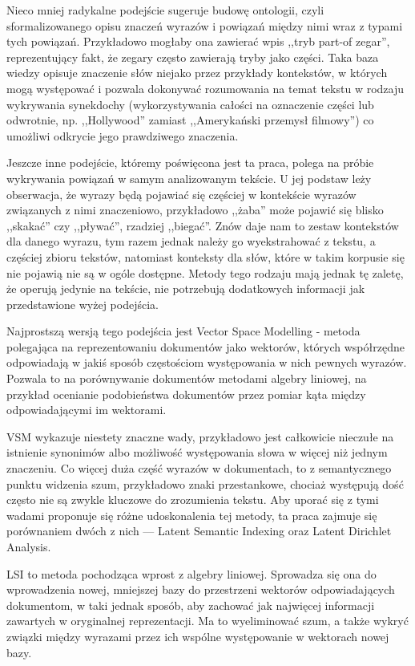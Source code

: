 \documentclass[11pt,a4paper]{article}
\begin{document}
Nieco mniej radykalne podejście sugeruje budowę ontologii, czyli
sformalizowanego opisu znaczeń wyrazów i powiązań między nimi wraz z typami
tych powiązań. Przykładowo mogłaby ona zawierać wpis ,,tryb part-of zegar'',
reprezentujący fakt, że zegary często zawierają tryby jako części. Taka baza
wiedzy opisuje znaczenie słów niejako przez przykłady kontekstów, w których
mogą występować i pozwala dokonywać rozumowania na temat tekstu w rodzaju
wykrywania synekdochy (wykorzystywania całości na oznaczenie części lub
odwrotnie, np. ,,Hollywood'' zamiast ,,Amerykański przemysł filmowy'') co
umożliwi odkrycie jego prawdziwego znaczenia.

Jeszcze inne podejście, któremy poświęcona jest ta praca, polega na próbie
wykrywania powiązań w samym analizowanym tekście. U jej podstaw leży
obserwacja, że wyrazy będą pojawiać się częściej w kontekście wyrazów
związanych z nimi znaczeniowo, przykładowo ,,żaba'' może pojawić się blisko
,,skakać'' czy ,,pływać'', rzadziej ,,biegać''. Znów daje nam to zestaw
kontekstów dla danego wyrazu, tym razem jednak należy go wyekstrahować z
tekstu, a częściej zbioru tekstów, natomiast konteksty dla słów, które w takim
korpusie się nie pojawią nie są w ogóle dostępne. Metody tego rodzaju mają
jednak tę zaletę, że operują jedynie na tekście, nie potrzebują dodatkowych
informacji jak przedstawione wyżej podejścia.

Najprostszą wersją tego podejścia jest Vector Space Modelling - metoda
polegająca na reprezentowaniu dokumentów jako wektorów, których współrzędne
odpowiadają w jakiś sposób częstościom występowania w nich pewnych wyrazów.
Pozwala to na porównywanie dokumentów metodami algebry liniowej, na przykład
ocenianie podobieństwa dokumentów przez pomiar kąta między odpowiadającymi im
wektorami.

VSM wykazuje niestety znaczne wady, przykładowo jest całkowicie nieczułe na
istnienie synonimów albo możliwość występowania słowa w więcej niż jednym
znaczeniu. Co więcej duża część wyrazów w dokumentach, to z semantycznego
punktu widzenia szum, przykładowo znaki przestankowe, chociaż występują dość
często nie są zwykle kluczowe do zrozumienia tekstu. Aby uporać się z tymi
wadami proponuje się różne udoskonalenia tej metody, ta praca zajmuje się
porównaniem dwóch z nich --- Latent Semantic Indexing oraz Latent Dirichlet
Analysis.

LSI to metoda pochodząca wprost z algebry liniowej. Sprowadza się ona do
wprowadzenia nowej, mniejszej bazy do przestrzeni wektorów odpowiadających
dokumentom, w taki jednak sposób, aby zachować jak najwięcej informacji
zawartych w oryginalnej reprezentacji. Ma to wyeliminować szum, a także wykryć
związki między wyrazami przez ich wspólne występowanie w wektorach nowej bazy.
\end{document}
